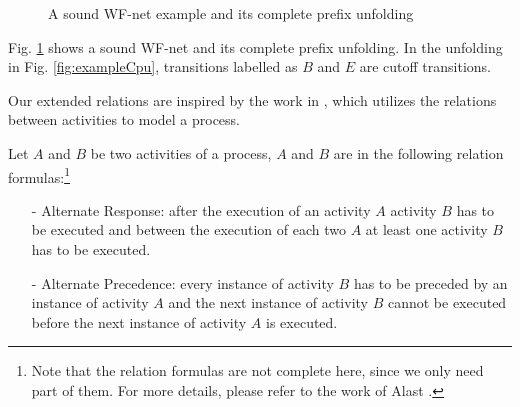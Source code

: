 \documentclass{llncs}
\begin{document}
\begin{figure}[htbp]
\centering
{}
\caption{A sound WF-net example and its complete prefix unfolding}
\label{fig:examplePetriAndCpu}
\end{figure}

\begin{example}\label{ex:petriAndCpu}
Fig. \ref{fig:examplePetriAndCpu} shows a sound WF-net and its complete prefix unfolding. In the unfolding in Fig. \ref{fig:exampleCpu}, transitions labelled as $B$ and $E$ are cutoff transitions.
\end{example}

Our extended relations are inspired by the work in \cite{van2006decserflow}, which utilizes the relations between activities to model a process.
\begin{definition}\label{def:relationFormulas}
Let $A$ and $B$ be two activities of a process, $A$ and $B$ are in the following relation formulas:\footnote{Note that the relation formulas are not complete here, since we only need part of them. For more details, please refer to the work of Alast \cite{van2006decserflow}.}
	\begin{itemize}
		\item[-] Alternate Response: after the execution of an activity $A$ activity $B$ has to be executed and between the execution of each two $A$ at least one activity $B$ has to be executed.
		\item[-] Alternate Precedence: every instance of activity $B$ has to be preceded by an instance of activity $A$ and the next instance of activity $B$ cannot be executed before the next instance of activity $A$ is executed.
	\end{itemize}
\end{definition}
\end{document}
